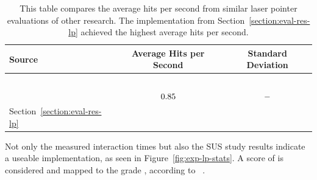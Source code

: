 \begin{table}[H]
	\centering
	\begin{tabular}{l c c}
		\toprule
		Source                                            & Average Hits per Second                                                            & Standard Deviation                                                                \\
		\midrule
		\citeauthor{Kamm.2018}~\cite{Kamm.2018}           & \pgfmathparse{\kammAvgHits}\pgfmathprintnumber[fixed, precision=2]{\pgfmathresult} & \pgfmathparse{\kammAvgStd}\pgfmathprintnumber[fixed, precision=2]{\pgfmathresult} \\%
		\citeauthor{JiYoungOh.2002}~\cite{JiYoungOh.2002} & \(0.85{}\)                                                                  & \(-{}\)                                                                  \\%
		Section~\ref{section:eval-res-lp}                 & \pgfmathparse{\oursAvgHits}\pgfmathprintnumber[fixed, precision=2]{\pgfmathresult} & \pgfmathparse{\oursAvgStd}\pgfmathprintnumber[fixed, precision=2]{\pgfmathresult} \\
		\bottomrule
	\end{tabular}
	\caption[Comparison of laser pointer task results]{This table compares the average hits per second from similar laser pointer evaluations of other research. The implementation from Section~\ref{section:eval-res-lp} achieved the highest average hits per second.}\label{tab:lp-comp}
\end{table}

Not only the measured interaction times but also the \gls{SUS} study results indicate a useable implementation, as seen in Figure~\ref{fig:exp-lp-stats}. A score of \evalExpLpSusScore{} is considered \evalExpLpSusAdj{} and mapped to the grade \evalExpLpSusGrade{}, according to \citeauthor{Bangor.2009}~\cite[120\psq]{Bangor.2009}.


